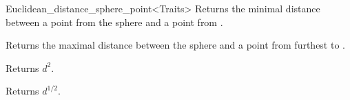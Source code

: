 \begin{ccRefClass}{Euclidean_distance_sphere_point<Traits>}
{Returns the minimal distance between a point from the sphere  and a point from
.}

{Returns the maximal distance between the sphere  and
a point from  furthest to . }

 {Returns $d^2$.}

 {Returns $d^{1/2}$.}


\ccSeeAlso




\end{ccRefClass}


